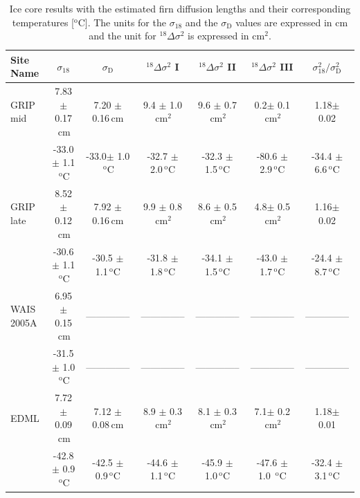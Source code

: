 \documentclass[11pt, draftcls, onecolumn]{IEEEtran} %
\numberwithin{equation}{section}
\numberwithin{table}{section}
\numberwithin{figure}{section}
\begin{document}
\begin{table}[]
\center
	\caption{Ice core results with the estimated firn diffusion lengths and their corresponding temperatures [$^\mathrm{o}$C].
		  The units for the $\sigma_{18}$ and the $\sigma_{\mathrm{D}}$ values are expressed in $\mathrm{cm}$ and the unit for ${}^{18}\Delta\sigma^2$
		is expressed in $\mathrm{cm}^2$.  }\label{tbl:icecore_results}
	\begin{tabular}{l c c c c c c} 
		\toprule
		Site Name & $\sigma_{18}$ & $\sigma_{\mathrm{D}}$ & ${}^{18}\Delta\sigma^2$  I & ${}^{18}\Delta\sigma^2$  II & ${}^{18}\Delta\sigma^2$  III & $\sigma^2_{18}/\sigma^2_{\mathrm{D}}$\\
		\midrule
		GRIP mid & 7.83 $\pm$ 0.17$\,\mathrm{cm}$& 7.20 $\pm$ 0.16$\,\mathrm{cm}$& 9.4 $\pm$ 1.0$\,\mathrm{cm}^2$& 9.6 $\pm$ 0.7$\,\mathrm{cm}^2$& 0.2$\pm$ 0.1$\,\mathrm{cm}^2$& 1.18$\pm$ 0.02\\
		& -33.0$\pm$ 1.1$\,^\mathrm{o}$C & -33.0$\pm$ 1.0$\,^\mathrm{o}$C& -32.7 $\pm$ 2.0$\,^\mathrm{o}$C& -32.3 $\pm$ 1.5$\,^\mathrm{o}$C& -80.6 $\pm$ 2.9$\,^\mathrm{o}$C& -34.4 $\pm$ 6.6$\,^\mathrm{o}$C\\
	
		GRIP late&8.52 $\pm$ 0.12$\,\mathrm{cm}$& 7.92 $\pm$ 0.16$\,\mathrm{cm}$& 9.9 $\pm$ 0.8$\,\mathrm{cm}^2$& 8.6 $\pm$ 0.5$\,\mathrm{cm}^2$& 4.8$\pm$ 0.5$\,\mathrm{cm}^2$& 1.16$\pm$ 0.02\\
		& -30.6 $\pm$ 1.1$\,^\mathrm{o}$C & -30.5 $\pm$ 1.1$\,^\mathrm{o}$C& -31.8 $\pm$ 1.8$\,^\mathrm{o}$C& -34.1 $\pm$ 1.5$\,^\mathrm{o}$C& -43.0 $\pm$ 1.7$\,^\mathrm{o}$C& -24.4 $\pm$ 8.7$\,^\mathrm{o}$C\\

		WAIS 2005A &6.95 $\pm$ 0.15$\,\mathrm{cm}$&--------------& --------------& --------------&--------------&--------------\\
		& -31.5 $\pm$ 1.0$\,^\mathrm{o}$C &-------------- &--------------&-------------- & --------------& --------------\\

		EDML &7.72 $\pm$ 0.09$\,\mathrm{cm}$& 7.12 $\pm$ 0.08$\,\mathrm{cm}$& 8.9 $\pm$ 0.3$\,\mathrm{cm}^2$& 8.1 $\pm$ 0.3$\,\mathrm{cm}^2$& 7.1$\pm$ 0.2$\,\mathrm{cm}^2$& 1.18$\pm$ 0.01\\
		& -42.8 $\pm$ 0.9$\,^\mathrm{o}$C & -42.5 $\pm$ 0.9$\,^\mathrm{o}$C& -44.6 $\pm$ 1.1$\,^\mathrm{o}$C& -45.9 $\pm$ 1.0$\,^\mathrm{o}$C& -47.6 $\pm$ 1.0 $\,^\mathrm{o}$C& -32.4 $\pm$ 3.1$\,^\mathrm{o}$C\\
		

\end{tabular}
\end{table}
\end{document}
